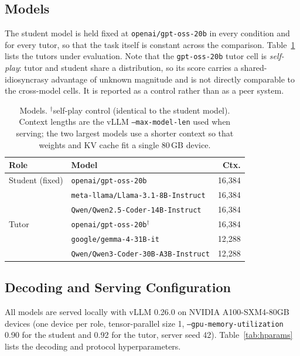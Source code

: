 \subsection{Models}
\label{app:models}

The student model is held fixed at \texttt{openai/gpt-oss-20b} in every
condition and for every tutor, so that the task itself is constant across the
comparison. Table~\ref{tab:models} lists the tutors under evaluation. Note
that the \texttt{gpt-oss-20b} tutor cell is \emph{self-play}: tutor and
student share a distribution, so its score carries a shared-idiosyncrasy
advantage of unknown magnitude and is not directly comparable to the
cross-model cells. It is reported as a control rather than as a peer system.

\begin{table}[t]
\centering
\small
\begin{tabular}{@{}llr@{}}
\toprule
\textbf{Role} & \textbf{Model} & \textbf{Ctx.} \\
\midrule
Student (fixed) & \texttt{openai/gpt-oss-20b} & 16{,}384 \\
\midrule
\multirow{5}{*}{Tutor}
 & \texttt{meta-llama/Llama-3.1-8B-Instruct}    & 16{,}384 \\
 & \texttt{Qwen/Qwen2.5-Coder-14B-Instruct}     & 16{,}384 \\
 & \texttt{openai/gpt-oss-20b}$^{\dagger}$      & 16{,}384 \\
 & \texttt{google/gemma-4-31B-it}               & 12{,}288 \\
 & \texttt{Qwen/Qwen3-Coder-30B-A3B-Instruct}   & 12{,}288 \\
\bottomrule
\end{tabular}
\caption{Models. $^{\dagger}$self-play control (identical to the student
model). Context lengths are the vLLM \texttt{--max-model-len} used when
serving; the two largest models use a shorter context so that weights and KV
cache fit a single 80\,GB device.}
\label{tab:models}
\end{table}

\subsection{Decoding and Serving Configuration}
\label{app:config}

All models are served locally with vLLM 0.26.0 on NVIDIA A100-SXM4-80GB
devices (one device per role, tensor-parallel size 1,
\texttt{--gpu-memory-utilization} 0.90 for the student and 0.92 for the
tutor, server seed 42). Table~\ref{tab:hparams} lists the decoding and
protocol hyperparameters.

